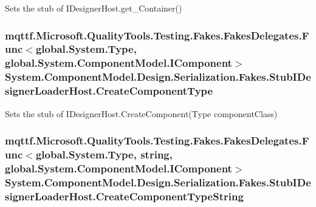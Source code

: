 Sets the stub of I\-Designer\-Host.\-get\-\_\-\-Container()

\hypertarget{class_system_1_1_component_model_1_1_design_1_1_serialization_1_1_fakes_1_1_stub_i_designer_loader_host_ae2b9c9a9e35a0daacec01d0aefcb823a}{
\subsubsection[{Create\-Component\-Type}]{\setlength{\rightskip}{0pt plus 5cm}mqttf.\-Microsoft.\-Quality\-Tools.\-Testing.\-Fakes.\-Fakes\-Delegates.\-Func$<$global.\-System.\-Type, global.\-System.\-Component\-Model.\-I\-Component$>$ System.\-Component\-Model.\-Design.\-Serialization.\-Fakes.\-Stub\-I\-Designer\-Loader\-Host.\-Create\-Component\-Type}}\label{class_system_1_1_component_model_1_1_design_1_1_serialization_1_1_fakes_1_1_stub_i_designer_loader_host_ae2b9c9a9e35a0daacec01d0aefcb823a}


Sets the stub of I\-Designer\-Host.\-Create\-Component(\-Type component\-Class)

\hypertarget{class_system_1_1_component_model_1_1_design_1_1_serialization_1_1_fakes_1_1_stub_i_designer_loader_host_a53f49ea17233e31caac5e47d885692a5}{
\subsubsection[{Create\-Component\-Type\-String}]{\setlength{\rightskip}{0pt plus 5cm}mqttf.\-Microsoft.\-Quality\-Tools.\-Testing.\-Fakes.\-Fakes\-Delegates.\-Func$<$global.\-System.\-Type, string, global.\-System.\-Component\-Model.\-I\-Component$>$ System.\-Component\-Model.\-Design.\-Serialization.\-Fakes.\-Stub\-I\-Designer\-Loader\-Host.\-Create\-Component\-Type\-String}}\label{class_system_1_1_component_model_1_1_design_1_1_serialization_1_1_fakes_1_1_stub_i_designer_loader_host_a53f49ea17233e31caac5e47d885692a5}


